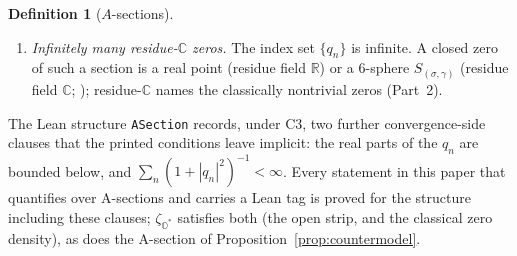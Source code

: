 \documentclass[11pt]{article}
\newcommand{\OO}{\mathbb{O}}
\newcommand{\CC}{\mathbb{C}}
\newcommand{\RR}{\mathbb{R}}
\newcommand{\Ostar}{\OO^{*}}
\newcommand{\zetaO}{\zeta_{\Ostar}}
\theoremstyle{plain}
\theoremstyle{definition}
\newtheorem{definition}[theorem]{Definition}
\theoremstyle{remark}
\begin{document}
\begin{definition}[$A$-sections]
\begin{enumerate}[label=\textup{(C\arabic*)},leftmargin=3.2em]
  Proposition~\ref{prop:weierstrass}\textup{)}. \textup{(}The left
  factor makes ``full divisor'' literal: the divisor of a meromorphic section includes its
  single pole; classically, Hadamard factors $(s-1)\zeta(s)$.\textup{)}
\item \emph{Infinitely many residue-$\CC$ zeros.} The index set $\{q_n\}$ is infinite. A closed
  zero of such a section is a real point \textup{(}residue field $\RR$\textup{)} or a $6$-sphere
  $S_{(\sigma,\gamma)}$ \textup{(}residue field $\CC$; \cite{AdFslice}\textup{)}; residue-$\CC$
  names the classically nontrivial zeros \textup{(}Part~2\textup{)}.
\end{enumerate}
\end{definition}

The Lean structure \texttt{ASection} records, under C3, two further convergence-side clauses that
the printed conditions leave implicit: the real parts of the $q_n$ are bounded below, and
$\sum_n (1+|q_n|^{2})^{-1}<\infty$. Every statement in this paper that quantifies over
A-sections and carries a Lean tag is proved for the structure including these clauses; $\zetaO$
satisfies both (the open strip, and the classical zero density), as does the A-section of
Proposition~\ref{prop:countermodel}.
\end{document}
